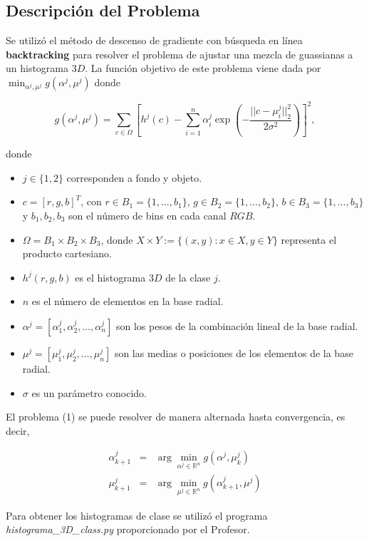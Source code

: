\documentclass[11pt,letterpaper]{article}
\theoremstyle{definition}
\theoremstyle{definition}
\theoremstyle{definition}
\begin{document}
\subsection{Descripción del Problema}
Se utilizó el método de descenso de gradiente con búsqueda en línea \textbf{backtracking} para resolver el problema de ajustar una mezcla de guassianas a un histograma $ 3D $. La función objetivo de este problema viene dada por $\min_{\alpha^j, \mu^j} g (\alpha^j, \mu^j)$ donde
\begin{shaded*}
	\begin{equation}
		g (\alpha^j, \mu^j) = \sum_{ c \in \Omega} \left[ h^j (c) - \sum_{i = 1}^n \alpha_i^j \exp \left(- \dfrac{|| c - \mu_i^j ||_2^2}{2 \sigma^2} \right) \right]^2,
	\end{equation}
\end{shaded*}
donde 
\begin{itemize}
	\item $ j \in \{1,2\} $ corresponden a fondo y objeto.
	\item $ c = \left[ r, g, b \right]^T $, con $ r \in B_1 = \{ 1, \dots, b_1 \} $, \newline
	$ g \in B_2 = \{ 1, \dots, b_2 \} $, $ b \in B_3 = \{ 1, \dots, b_3 \} $ y $ b_1, b_2, b_3 $ son el número de bins en cada canal $ RGB $.
	\item $ \Omega = B_1 \times B_2 \times B_3 $, donde $ X \times Y := \{ (x,y) : x \in X, y \in Y \}$ representa el producto cartesiano.
	\item $ h^j (r, g,b) $ es el histograma $ 3D $ de la clase $ j $.
	\item $ n $ es el número de elementos en la base radial.
	\item $ \alpha^j = \left[ \alpha_1^j, \alpha_2^j, \dots, \alpha_n^j \right] $ son los pesos de la combinación lineal de la base radial.
	\item $ \mu^j = \left[ \mu_1^j, \mu_2^j, \dots, \mu_n^j \right] $ son las medias o posiciones de los elementos de la base radial.
	\item $ \sigma $ es un parámetro conocido.
\end{itemize}
El problema (1) se puede resolver de manera alternada hasta convergencia, es decir,
\begin{shaded*}
	\begin{eqnarray*}
		\alpha_{k+1}^j & = & \arg \min_{\alpha^j \in \mathbb{R}^n} g(\alpha^j, \mu_k ^j) \\
		\mu_{k+1}^j    & = & \arg \min_{\mu^j \in \mathbb{R}^n} g(\alpha^j_{k+1}, \mu^j)
	\end{eqnarray*}
\end{shaded*}
Para obtener los histogramas de clase se utilizó el programa \textit{histograma\_3D\_class.py} proporcionado por el Profesor.
\end{document}
